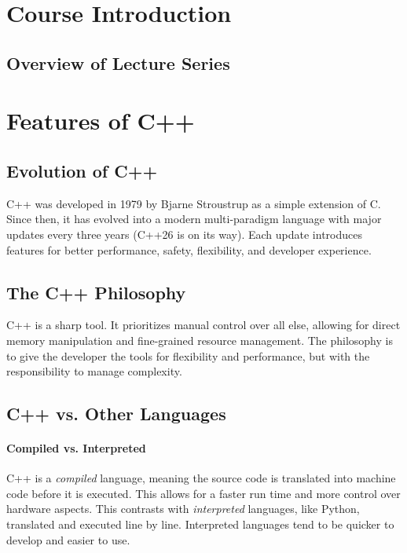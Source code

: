 \documentclass{article}
\title{\thistitle}
\author{\me}
\date{\today}
\begin{document}
\maketitle
\tableofcontents

\section{Course Introduction}

\subsection{Overview of Lecture Series}

\section{Features of C++}

\subsection{Evolution of C++}

\noindent
C++ was developed in 1979 by Bjarne Stroustrup as a simple extension of C. Since then, it has evolved into a modern multi-paradigm language with major updates every three years (C++26 is on its way). Each update introduces features for better performance, safety, flexibility, and developer experience. 

\subsection{The C++ Philosophy}

\noindent
C++ is a sharp tool. It prioritizes manual control over all else, allowing for direct memory manipulation and fine-grained resource management. The philosophy is to give the developer the tools for flexibility and performance, but with the responsibility to manage complexity.

\subsection{C++ vs. Other Languages}

\paragraph{Compiled vs. Interpreted}
C++ is a \textit{compiled} language, meaning the source code is translated into machine code before it is executed. This allows for a faster run time and more control over hardware aspects. This contrasts with \textit{interpreted} languages, like Python, translated and executed line by line. Interpreted languages tend to be quicker to develop and easier to use.
\end{document}
